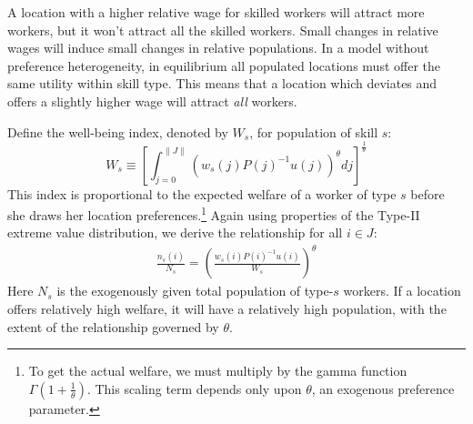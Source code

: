 \documentclass[12 pt]{article}
\begin{document}
A location with a higher relative wage for skilled workers will attract more workers, but it won't attract all the skilled workers.  Small changes in relative wages will induce small changes in relative populations.  In a model without preference heterogeneity, in equilibrium all populated locations must offer the same utility within skill type.  This means that a location which deviates and offers a slightly higher wage will attract \emph{all} workers.

Define the well-being index, denoted by $W_s$, for population of skill $s$:
\begin{equation*}
    W_s \equiv \left[\int_{j=0}^{\|J\|}\left(w_s(j) P(j)^{-1} u(j)\right)^\theta dj\right]^{\frac{1}{\theta}}
\end{equation*}
This index is proportional to the expected welfare of a worker of type $s$ before she draws her location preferences.\footnote{To get the actual welfare, we must multiply by the gamma function $\Gamma(1 +\frac{1}{\theta})$.  This scaling term depends only upon $\theta$, an exogenous preference parameter.}  Again using properties of the Type-II extreme value distribution, we derive the relationship for all $i \in J$:
\begin{eqnarray}\label{eq:indiff}
    \frac{n_s(i)}{N_s} = \left(\frac{w_s(i) P(i)^{-1} u(i)}{W_s}\right)^{\theta}
\end{eqnarray}
Here $N_s$ is the exogenously given total population of type-$s$ workers. If a location offers relatively high welfare, it will have a relatively high population, with the extent of the relationship governed by $\theta$.
\end{document}
